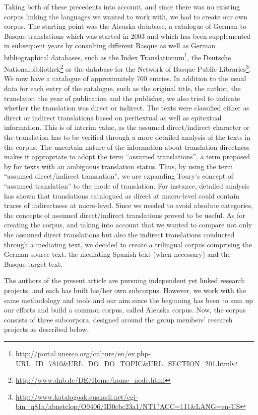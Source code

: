 \documentclass[output=paper]{LSP/langsci}
\begin{document}
Taking both of these precedents into account, and since there was no existing corpus linking the languages we wanted to work with, we had to create our own corpus. The starting point was the Aleuska database, a catalogue of German to Basque translations which was started in 2003 and which has been supplemented in subsequent years by consulting different Basque as well as German bibliographical databases, such as the Index Translationum\footnote{\url{http://portal.unesco.org/culture/en/ev.php-URL_ID=7810&URL_DO=DO_TOPIC&URL_SECTION=201.html}}, the Deutsche Nationalbibliothek\footnote{\url{http://www.dnb.de/DE/Home/home_node.html}} or the database for the Network of Basque Public Libraries\footnote{\url{http://www.katalogoak.euskadi.net/cgi-bin_q81a/abnetclop/O9406/ID0cbc23a1/NT1?ACC=111&LANG=en-US}}. We now have a catalogue of approximately 700 entries. In addition to the usual data for each entry of the catalogue, such as the original title, the author, the translator, the year of publication and the publisher, we also tried to indicate whether the translation was direct or indirect. The texts were classified either as direct or indirect translations based on peritextual as well as epitextual information. This is of interim value, as the assumed direct/indirect character or the translation has to be verified through a more detailed analysis of the texts in the corpus. The uncertain nature of the information about translation directness makes it appropriate to adopt the term “assumed translations”, a term proposed by \citet{Toury1995} for texts with an ambiguous translation status. Thus, by using the term “assumed direct/indirect translation”, we are expanding Toury's concept of “assumed translation” to the mode of translation. For instance, detailed analysis has shown that translations catalogued as direct at macro-level could contain traces of indirectness at micro-level. Since we needed to avoid absolute categories, the concepts of assumed direct/indirect translations proved to be useful. As for creating the corpus, and taking into account that we wanted to compare not only the assumed direct translations but also the indirect translations conducted through a mediating text, we decided to create a trilingual corpus comprising the German source text, the mediating Spanish text (when necessary) and the Basque target text.

The authors of the present article are pursuing independent yet linked research projects, and each has built his/her own subcorpus. However, we work with the same methodology and tools and our aim since the beginning has been to sum up our efforts and build a common corpus, called Aleuska corpus. Now, the corpus consists of three subcorpora, designed around the group members' research projects as described below.
\end{document}
